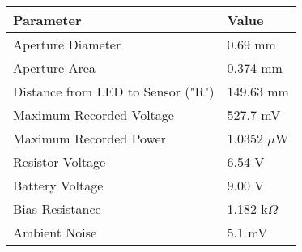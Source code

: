 \begin{table}[!htb]
\centering
\begin{tabular}{l|l}
\rowcolor[HTML]{C0C0C0} 
\textbf{Parameter} & \textbf{Value} \\ \hline
Aperture Diameter & 0.69 mm \\
Aperture Area & 0.374 mm \\
Distance from LED to Sensor ("R") & 149.63 mm \\
Maximum Recorded Voltage & 527.7 mV \\
Maximum Recorded Power & 1.0352 $\mu$W \\
Resistor Voltage & 6.54 V \\
Battery Voltage & 9.00 V \\
Bias Resistance & 1.182 k$\Omega$ \\
Ambient Noise & 5.1 mV
\end{tabular}
\end{table}